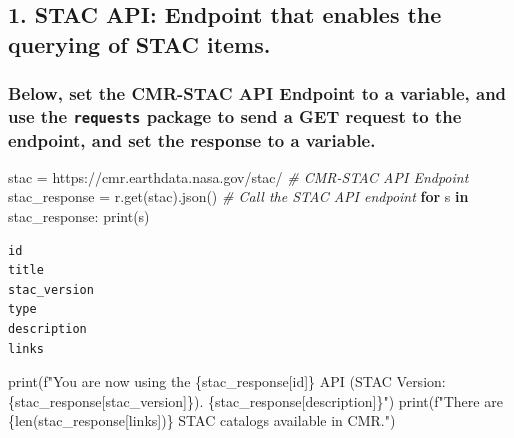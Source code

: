 \documentclass[
  letterpaper,
]{scrartcl}
\newenvironment{Shaded}{}{}
\newcommand{\BuiltInTok}[1]{#1}
\newcommand{\CommentTok}[1]{\textcolor[rgb]{0.38,0.63,0.69}{\textit{#1}}}
\newcommand{\ControlFlowTok}[1]{\textcolor[rgb]{0.00,0.44,0.13}{\textbf{#1}}}
\newcommand{\KeywordTok}[1]{\textcolor[rgb]{0.00,0.44,0.13}{\textbf{#1}}}
\newcommand{\NormalTok}[1]{#1}
\newcommand{\OperatorTok}[1]{\textcolor[rgb]{0.40,0.40,0.40}{#1}}
\newcommand{\SpecialCharTok}[1]{\textcolor[rgb]{0.25,0.44,0.63}{#1}}
\newcommand{\SpecialStringTok}[1]{\textcolor[rgb]{0.73,0.40,0.53}{#1}}
\newcommand{\StringTok}[1]{\textcolor[rgb]{0.25,0.44,0.63}{#1}}
\begin{document}
\hypertarget{stac-api-endpoint-that-enables-the-querying-of-stac-items.}{%
\subsection{1. STAC API: Endpoint that enables the querying of STAC
items.}\label{stac-api-endpoint-that-enables-the-querying-of-stac-items.}}

\hypertarget{below-set-the-cmr-stac-api-endpoint-to-a-variable-and-use-the-requests-package-to-send-a-get-request-to-the-endpoint-and-set-the-response-to-a-variable.}{%
\subsubsection{\texorpdfstring{Below, set the CMR-STAC API Endpoint to a
variable, and use the \texttt{requests} package to send a GET request to
the endpoint, and set the response to a
variable.}{Below, set the CMR-STAC API Endpoint to a variable, and use the requests package to send a GET request to the endpoint, and set the response to a variable.}}\label{below-set-the-cmr-stac-api-endpoint-to-a-variable-and-use-the-requests-package-to-send-a-get-request-to-the-endpoint-and-set-the-response-to-a-variable.}}

\begin{Shaded}
\begin{Highlighting}[]
\NormalTok{stac }\OperatorTok{=} \StringTok{\textquotesingle{}https://cmr.earthdata.nasa.gov/stac/\textquotesingle{}} \CommentTok{\# CMR{-}STAC API Endpoint}
\NormalTok{stac\_response }\OperatorTok{=}\NormalTok{ r.get(stac).json()            }\CommentTok{\# Call the STAC API endpoint}
\ControlFlowTok{for}\NormalTok{ s }\KeywordTok{in}\NormalTok{ stac\_response: }\BuiltInTok{print}\NormalTok{(s)}
\end{Highlighting}
\end{Shaded}

\begin{verbatim}
id
title
stac_version
type
description
links
\end{verbatim}

\begin{Shaded}
\begin{Highlighting}[]
\BuiltInTok{print}\NormalTok{(}\SpecialStringTok{f"You are now using the }\SpecialCharTok{\{}\NormalTok{stac\_response[}\StringTok{\textquotesingle{}id\textquotesingle{}}\NormalTok{]}\SpecialCharTok{\}}\SpecialStringTok{ API (STAC Version: }\SpecialCharTok{\{}\NormalTok{stac\_response[}\StringTok{\textquotesingle{}stac\_version\textquotesingle{}}\NormalTok{]}\SpecialCharTok{\}}\SpecialStringTok{). }\SpecialCharTok{\{}\NormalTok{stac\_response[}\StringTok{\textquotesingle{}description\textquotesingle{}}\NormalTok{]}\SpecialCharTok{\}}\SpecialStringTok{"}\NormalTok{)}
\BuiltInTok{print}\NormalTok{(}\SpecialStringTok{f"There are }\SpecialCharTok{\{}\BuiltInTok{len}\NormalTok{(stac\_response[}\StringTok{\textquotesingle{}links\textquotesingle{}}\NormalTok{])}\SpecialCharTok{\}}\SpecialStringTok{ STAC catalogs available in CMR."}\NormalTok{)}
\end{Highlighting}
\end{Shaded}
\end{document}
